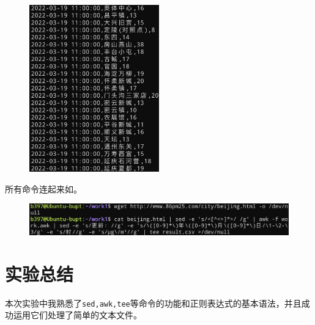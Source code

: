 \documentclass[lang=cn,11pt,a4paper,cite=authornum]{paper}
\begin{document}
\begin{figure}[!htb]
    \centering
    \includegraphics[width=0.5\textwidth]{./images/l1-p3.jpg}
    \caption{\label{fig:p3}}
\end{figure}

所有命令连起来如。

\begin{figure}[!htb]
    \centering
    \includegraphics[width=\textwidth]{./images/l1-p4.jpg}
    \caption{\label{fig:p4}}
\end{figure}

\section{实验总结}

本次实验中我熟悉了\texttt{sed,awk,tee}等命令的功能和正则表达式的基本语法，并且成功运用它们处理了简单的文本文件。
\end{document}
